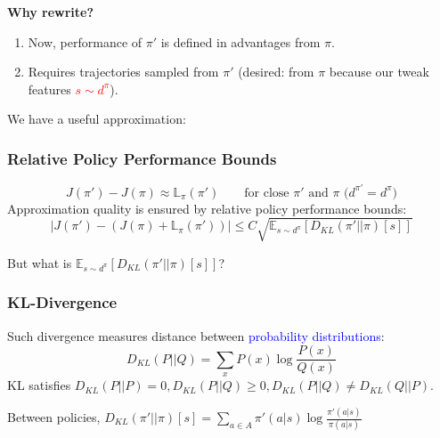 \documentclass{article}
\begin{document}
    \textbf{Why rewrite?}
    \begin{enumerate}
    \item Now, performance of $\pi'$ is defined in advantages from $\pi$.
    \item Requires trajectories sampled from $\pi'$ (desired: from $\pi$ because our tweak features \textcolor{red}{$s \sim d^{\pi}$}).
    \end{enumerate}

    We have a useful approximation:
    \begin{thmbox}
        \subsubsection*{Relative Policy Performance Bounds}
        \begin{equation*}
            J(\pi') - J(\pi) \approx \mathbb{L}_{\pi} (\pi') \quad\quad \text{for close $\pi'$ and $\pi$ ($d^{\pi'} = d^{\pi}$)}
        \end{equation*}
        Approximation quality is ensured by relative policy performance bounds:
        \begin{equation*}
            |J(\pi') - \left( J(\pi) + \mathbb{L}_{\pi} (\pi') \right)| \leq C \sqrt{\mathbb{E}_{s \sim d^{\pi}} \left[ D_{KL} (\pi' || \pi) [s]\right]}
        \end{equation*}
    \end{thmbox}
    
    But what is $\mathbb{E}_{s \sim d^{\pi}} \left[ D_{KL} (\pi' || \pi) [s]\right]$? 
    \begin{defbox}
        \subsubsection*{KL-Divergence}
        Such divergence measures distance between \textcolor{blue}{probability distributions}:
        \begin{equation*}
            D_{KL} (P || Q) = \sum_{x} P(x) \log \frac{P(x)}{Q(x)}
        \end{equation*}
        KL satisfies $D_{KL}(P || P) = 0, D_{KL}(P || Q) \geq 0, D_{KL}(P || Q) \neq D_{KL}(Q || P)$.

        Between policies, $D_{KL}(\pi' || \pi) [s] = \sum_{a \in A} \pi' (a | s) \log \frac{\pi' (a | s)}{\pi (a | s)}$
    \end{defbox}
\end{document}
